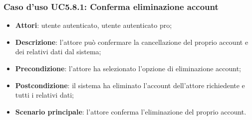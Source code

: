 \subsubsection{Caso d'uso UC5.8.1: Conferma eliminazione account}

\begin{itemize}
	\item \textbf{Attori}: utente autenticato, utente autenticato pro;
	\item \textbf{Descrizione}: l'attore può confermare la cancellazione del proprio account e dei relativi dati dal sistema;
	\item \textbf{Precondizione}: l'attore ha selezionato l'opzione di eliminazione account;
	\item \textbf{Postcondizione}: il sistema ha eliminato l'account dell'attore richiedente e tutti i relativi dati;
	\item \textbf{Scenario principale}: l'attore conferma l'eliminazione del proprio account.
\end{itemize}
